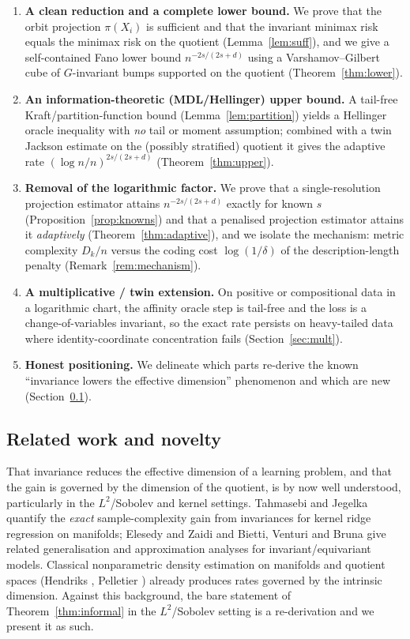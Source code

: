 \documentclass[11pt]{article}
\theoremstyle{plain}
\theoremstyle{definition}
\theoremstyle{remark}
\begin{document}
\begin{enumerate}[leftmargin=1.6em,label=(\arabic*)]
\item \textbf{A clean reduction and a complete lower bound.} We prove that the
orbit projection $\pi(X_i)$ is sufficient and that the invariant minimax risk
equals the minimax risk on the quotient (Lemma~\ref{lem:suff}), and we give a
self-contained Fano lower bound $n^{-2s/(2s+d)}$ using a Varshamov--Gilbert cube of
$G$-invariant bumps supported on the quotient (Theorem~\ref{thm:lower}).
\item \textbf{An information-theoretic (MDL/Hellinger) upper bound.} A tail-free
Kraft/partition-function bound (Lemma~\ref{lem:partition}) yields a Hellinger
oracle inequality with \emph{no} tail or moment assumption; combined with a twin
Jackson estimate on the (possibly stratified) quotient it gives the adaptive rate
$(\log n/n)^{2s/(2s+d)}$ (Theorem~\ref{thm:upper}).
\item \textbf{Removal of the logarithmic factor.} We prove that a single-resolution
projection estimator attains $n^{-2s/(2s+d)}$ exactly for known $s$
(Proposition~\ref{prop:knowns}) and that a penalised projection estimator attains
it \emph{adaptively} (Theorem~\ref{thm:adaptive}), and we isolate the mechanism:
metric complexity $D_k/n$ versus the coding cost $\log(1/\delta)$ of the
description-length penalty (Remark~\ref{rem:mechanism}).
\item \textbf{A multiplicative / twin extension.} On positive or compositional data
in a logarithmic chart, the affinity oracle step is tail-free and the loss is a
change-of-variables invariant, so the exact rate persists on heavy-tailed data
where identity-coordinate concentration fails (Section~\ref{sec:mult}).
\item \textbf{Honest positioning.} We delineate which parts re-derive the known
``invariance lowers the effective dimension'' phenomenon and which are new
(Section~\ref{sec:related}).
\end{enumerate}

\subsection{Related work and novelty}\label{sec:related}

That invariance reduces the effective dimension of a learning problem, and that
the gain is governed by the dimension of the quotient, is by now well understood,
particularly in the $L^2$/Sobolev and kernel settings. Tahmasebi and Jegelka
\cite{tahmasebi2023} quantify the \emph{exact} sample-complexity gain from
invariances for kernel ridge regression on manifolds; Elesedy and Zaidi
\cite{elesedy2021} and Bietti, Venturi and Bruna \cite{bietti2021} give related
generalisation and approximation analyses for invariant/equivariant models.
Classical nonparametric density estimation on manifolds and quotient spaces
(Hendriks \cite{hendriks1990}, Pelletier \cite{pelletier2005}) already produces
rates governed by the intrinsic dimension. Against this background, the bare
statement of Theorem~\ref{thm:informal} in the $L^2$/Sobolev setting is a
re-derivation and we present it as such.
\end{document}
